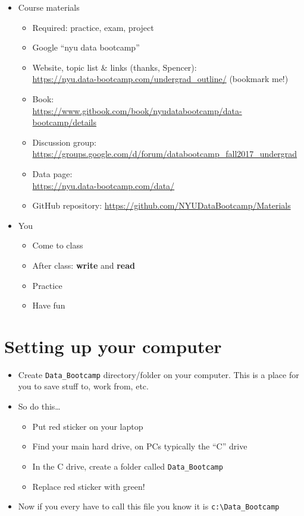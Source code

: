 \begin{itemize}
\item Course materials
\begin{itemize}
\item Required:  practice, exam, project
\item Google ``nyu data bootcamp''
\item Website, topic list \& links  (thanks, Spencer):\\ \url{https://nyu.data-bootcamp.com/undergrad_outline/}  (bookmark me!)
\item Book: \\ \url{https://www.gitbook.com/book/nyudatabootcamp/data-bootcamp/details}
\item Discussion group: \\ \url{https://groups.google.com/d/forum/databootcamp_fall2017_undergrad}
\item Data page: \\
\url{https://nyu.data-bootcamp.com/data/}
\item GitHub repository:  \url{https://github.com/NYUDataBootcamp/Materials}
\end{itemize}

\item You
\begin{itemize}
\item Come to class
\item After class:  {\bf write} and {\bf read}
\item Practice
\item Have fun
\end{itemize}
\end{itemize}

\section*{Setting up your computer}
\begin{itemize}
\item Create \verb|Data_Bootcamp| directory/folder on your computer. This is a place for you to save stuff to, work from, etc.
\item So do this\ldots
\begin{itemize}
\item Put red sticker on your laptop
\item Find your main hard drive, on PCs typically the ``C'' drive
\item In the C drive, create a folder called \verb|Data_Bootcamp|
\item Replace red sticker with green!
\end{itemize}
\item Now if you every have to call this file you know it is \verb|c:\Data_Bootcamp|
\end{itemize}

